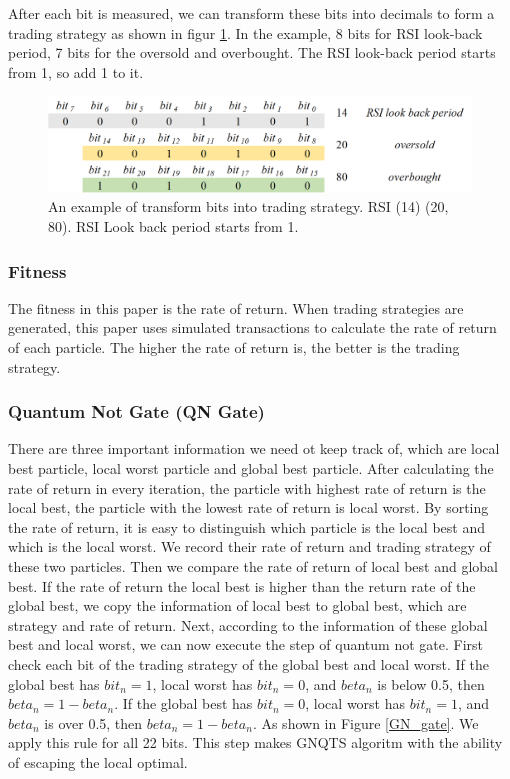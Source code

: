\documentclass[../Proposed Method.tex]{subfiles}
\begin{document}
\bigbreak

After each bit is measured, we can transform these bits into decimals to form a trading strategy as shown in figur \ref{form_strategy}. In the example, 8 bits for RSI look-back period, 7 bits for the oversold and overbought. The RSI look-back period starts from 1, so add 1 to it.

\begin{figure}[H]
    \centering
    \includegraphics[scale = 0.5] {figure/form_strategy.png}
    \caption{An example of transform bits into trading strategy. RSI (14) (20, 80).
        RSI Look back period starts from 1.}
    \label{form_strategy}
\end{figure}

\subsubsection{Fitness}

The fitness in this paper is the rate of return. When trading strategies are generated, this paper uses simulated transactions to calculate the rate of return of each particle. The higher the rate of return is, the better is the trading strategy.

\subsubsection{Quantum Not Gate (QN Gate)}

There are three important information we need ot keep track of, which are local best particle, local worst particle and global best particle.  After calculating the rate of return in every iteration, the particle with highest rate of return is the local best, the particle with the lowest rate of return is local worst. By sorting the rate of return, it is easy to distinguish which particle is the local best and which is the local worst. We record their rate of return and trading strategy of these two particles. Then we compare the rate of return of local best and global best. If the rate of return the local best is higher than the return rate of the global best, we copy the information of local best to global best, which are strategy and rate of return. Next, according to the information of these global best and local worst, we can now execute the step of quantum not gate. First check each bit of the trading strategy of the global best and local worst.  If the global best has $bit_n = 1$, local worst has $bit_n = 0$, and $beta_n$ is below 0.5, then $beta_n = 1- beta_n$. If the global best has $bit_n = 0$, local worst has $bit_n = 1$, and $beta_n$ is over 0.5, then $beta_n = 1- beta_n$. As shown in Figure \ref{GN_gate}. We apply this rule for all 22 bits. This step makes GNQTS algoritm with the ability of escaping the local optimal.
\end{document}
